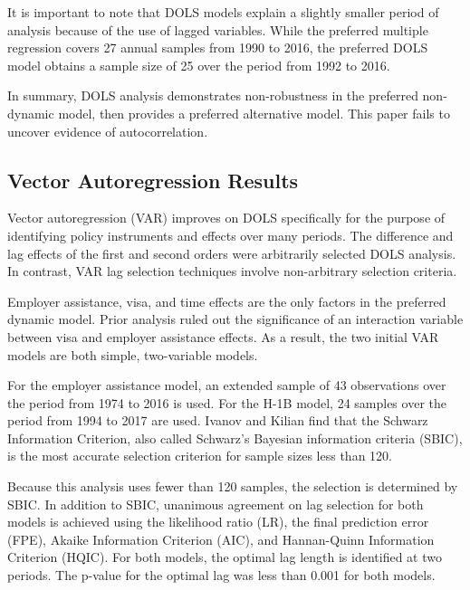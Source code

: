 \documentclass[review]{elsarticle}
\begin{document}
It is important to note that DOLS models explain a slightly smaller period of analysis because of the use of lagged variables.
While the preferred multiple regression covers 27 annual samples from 1990 to 2016,
the preferred DOLS model obtains a sample size of 25 over the period from 1992 to 2016.

In summary, DOLS analysis demonstrates non-robustness in the preferred non-dynamic model,
then provides a preferred alternative model.
This paper fails to uncover evidence of autocorrelation.

\subsection{Vector Autoregression Results}
Vector autoregression (VAR) improves on DOLS specifically for the purpose
of identifying policy instruments and effects over many periods.
The difference and lag effects of the first and second orders were arbitrarily selected DOLS analysis.
In contrast, VAR lag selection techniques involve non-arbitrary selection criteria.

Employer assistance, visa, and time effects are the only factors in the preferred dynamic model.
Prior analysis ruled out the significance of an interaction variable between
visa and employer assistance effects.
As a result, the two initial VAR models are both simple, two-variable models.

For the employer assistance model,
an extended sample of 43 observations
over the period from 1974 to 2016 is used.
For the H-1B model, 24 samples over the period from 1994 to 2017 are used.
Ivanov and Kilian find that the Schwarz Information Criterion,
also called Schwarz's Bayesian information criteria (SBIC),
is the most accurate selection criterion for sample sizes less than 120\cite{ivanov2005practitioner}.

Because this analysis uses fewer than 120 samples, the selection is determined by SBIC.
In addition to SBIC, unanimous agreement on lag selection for both models is achieved using the likelihood ratio (LR),
the final prediction error (FPE), Akaike Information Criterion (AIC), and Hannan-Quinn Information Criterion (HQIC).
For both models, the optimal lag length is identified at two periods.
The p-value for the optimal lag was less than 0.001 for both models.
\end{document}
